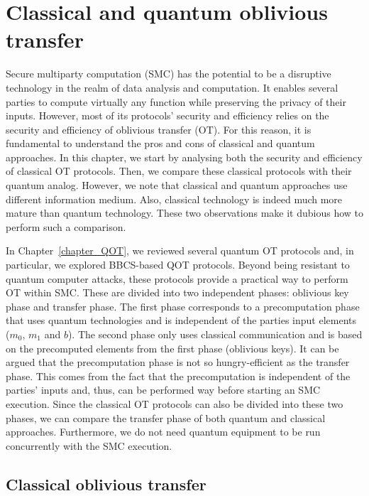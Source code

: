 


%

\chapter{Classical and quantum oblivious transfer}\label{classical-and-quantum-OT}

Secure multiparty computation (SMC) has the potential to be a disruptive technology in the realm of data analysis and computation. It enables several parties to compute virtually any function while preserving the privacy of their inputs. However, most of its protocols’ security and efficiency relies on the security and efficiency of oblivious transfer (OT). For this reason, it is fundamental to understand the pros and cons of classical and quantum approaches. In this chapter, we start by analysing both the security and efficiency of classical OT protocols. Then, we compare these classical protocols with their quantum analog. However, we note that classical and quantum approaches use different information medium. Also, classical technology is indeed much more mature than quantum technology. These two observations make it dubious how to perform such a comparison. 

In Chapter~\ref{chapter_QOT}, we reviewed several quantum OT protocols and, in particular, we explored BBCS-based QOT protocols. Beyond being resistant to quantum computer attacks, these protocols provide a practical way to perform OT within SMC. These are divided into two independent phases: oblivious key phase and transfer phase. The first phase corresponds to a precomputation phase that uses quantum technologies and is independent of the parties input elements ($m_0$, $m_1$ and $b$). The second phase only uses classical communication and is based on the precomputed elements from the first phase (oblivious keys). It can be argued that the precomputation phase is not so hungry-efficient as the transfer phase. This comes from the fact that the precomputation is independent of the parties' inputs and, thus, can be performed way before starting an SMC execution. Since the classical OT protocols can also be divided into these two phases, we can compare the transfer phase of both quantum and classical approaches. Furthermore, we do not need quantum equipment to be run concurrently with the SMC execution.


\section{Classical oblivious transfer}\label{Classical-OT}


